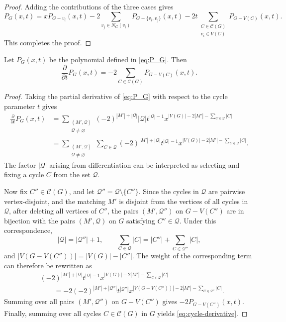 \documentclass[11pt, a4paper]{article}
\begin{document}
\begin{proof}
Adding the contributions of the three cases gives
\[
P_G(x,t)
=
 xP_{G-v_i}(x,t)
-2\sum_{v_j\in N_G(v_i)}P_{G-\{v_i,v_j\}}(x,t)
-2t\sum_{\substack{C\in\mathcal{C}(G)\\v_i\in V(C)}}P_{G-V(C)}(x,t).
\]
This completes the proof.
\end{proof}

\begin{lemma}\label{lem:cycle-derivative}
Let $P_G(x,t)$ be the polynomial defined in \eqref{eq:P_G}. Then
\begin{equation}\label{eq:cycle-derivative}
 \frac{\partial}{\partial t}P_G(x,t)
 =-2\sum_{C\in\mathcal{C}(G)}P_{G-V(C)}(x,t).
\end{equation}
\end{lemma}
\begin{proof}
Taking the partial derivative of \eqref{eq:P_G} with respect to the cycle parameter $t$ gives
\[
\begin{aligned}
\frac{\partial}{\partial t}P_G(x,t)
&=
\sum_{\substack{(M',\mathcal{Q})\\\mathcal{Q}\neq\varnothing}}
(-2)^{|M'|+|\mathcal{Q}|}
|\mathcal{Q}|t^{|\mathcal{Q}|-1}
x^{|V(G)|-2|M'|-\sum_{C\in \mathcal{Q}}|C|}                                      \\
&=
\sum_{\substack{(M',\mathcal{Q})\\\mathcal{Q}\neq\varnothing}}
\sum_{C\in \mathcal{Q}}
(-2)^{|M'|+|\mathcal{Q}|}
t^{|\mathcal{Q}|-1}
x^{|V(G)|-2|M'|-\sum_{C\in \mathcal{Q}}|C|}.
\end{aligned}
\]
The factor $|\mathcal{Q}|$ arising from differentiation can be interpreted as
selecting and fixing a cycle $C$ from the set $\mathcal{Q}$.

Now fix $C''\in\mathcal{C}(G)$, and let $\mathcal{Q}''=\mathcal{Q}\setminus\{C''\}$.
Since the cycles in $\mathcal{Q}$ are pairwise vertex-disjoint,
and the matching $M'$ is disjoint from the vertices of all cycles in $\mathcal{Q}$,
after deleting all vertices of $C''$, the pairs $(M',\mathcal{Q}'')$ on $G-V(C'')$ are in bijection with
the pairs $(M',\mathcal{Q})$ on $G$ satisfying $C''\in\mathcal{Q}$.
Under this correspondence,
\[
|\mathcal{Q}|=|\mathcal{Q}''|+1,
\qquad
\sum_{C\in \mathcal{Q}}|C|
=
|C''|+\sum_{C\in \mathcal{Q}''}|C|,
\]
and $|V(G-V(C''))|=|V(G)|-|C''|$.
The weight of the corresponding term can therefore be rewritten as
\[
\begin{aligned}
&(-2)^{|M'|+|\mathcal{Q}|}
t^{|\mathcal{Q}|-1}
x^{|V(G)|-2|M'|-\sum_{C\in \mathcal{Q}}|C|}                                      \\
&\qquad
=
-2(-2)^{|M'|+|\mathcal{Q}''|}
t^{|\mathcal{Q}''|}
x^{|V(G-V(C''))|-2|M'|-\sum_{C\in \mathcal{Q}''}|C|}.
\end{aligned}
\]
Summing over all pairs $(M',\mathcal{Q}'')$ on $G-V(C'')$ gives $-2P_{G-V(C'')}(x,t)$.
Finally, summing over all cycles $C\in\mathcal{C}(G)$ in $G$ yields \eqref{eq:cycle-derivative}.
\end{proof}
\end{document}
